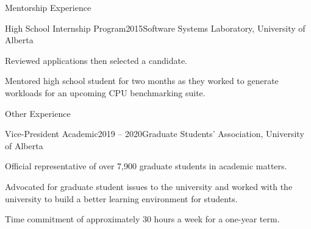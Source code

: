 \documentclass{cv}
\begin{document}

\begin{rSection}{Mentorship Experience}

\begin{rSubsection}{High School Internship Program}{2015}{Software Systems Laboratory, University of Alberta}
\item Reviewed applications then selected a candidate.
\item Mentored high school student for two months as they worked to generate workloads for an upcoming CPU benchmarking suite.
\end{rSubsection}

\end{rSection}


\begin{rSection}{Other Experience}

\begin{rSubsection}{Vice-President Academic}{2019 -- 2020}{Graduate Students' Association, University of Alberta}
\item Official representative of over 7,900 graduate students in academic matters.
\item Advocated for graduate student issues to the university and worked with the university to build a better learning environment for students.
\item Time commitment of approximately 30 hours a week for a one-year term.
\end{rSubsection}

\end{rSection}

\end{document}
